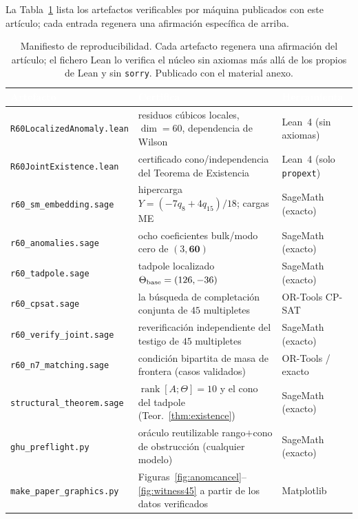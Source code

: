 \documentclass[11pt,a4paper]{article}
\begin{document}
La Tabla~\ref{tab:artifacts} lista los artefactos verificables por m\'aquina publicados con este
art\'iculo; cada entrada regenera una afirmaci\'on espec\'ifica de arriba.

\begin{table}[h]
\centering
\footnotesize
{}
\begin{tabular}{lll}
\toprule
\rowcolor{hdrblue}
\textcolor{white}{Artefacto} & \textcolor{white}{Certifica} & \textcolor{white}{Herramienta}\\
\midrule
\texttt{R60LocalizedAnomaly.lean} & residuos c\'ubicos locales, $\dim=60$, dependencia de Wilson & Lean~4 (sin axiomas)\\
\texttt{R60JointExistence.lean}   & certificado cono/independencia del Teorema de Existencia & Lean~4 (solo \texttt{propext})\\
\texttt{r60\_sm\_embedding.sage}   & hipercarga $Y=(-7q_8+4q_{15})/18$; cargas ME & SageMath (exacto)\\
\texttt{r60\_anomalies.sage}       & ocho coeficientes bulk/modo cero de $(3,\mathbf{60})$ & SageMath (exacto)\\
\texttt{r60\_tadpole.sage}         & tadpole localizado $\Theta_{\rm base}=(126,-36)$ & SageMath (exacto)\\
\texttt{r60\_cpsat.sage}           & la b\'usqueda de completaci\'on conjunta de $45$ multipletes & OR-Tools CP-SAT\\
\texttt{r60\_verify\_joint.sage}   & reverificaci\'on independiente del testigo de $45$ multipletes & SageMath (exacto)\\
\texttt{r60\_n7\_matching.sage}    & condici\'on bipartita de masa de frontera (casos validados) & OR-Tools / exacto\\
\texttt{structural\_theorem.sage} & $\operatorname{rank}[A;\Theta]=10$ y el cono del tadpole (Teor.~\ref{thm:existence}) & SageMath (exacto)\\
\texttt{ghu\_preflight.py}        & or\'aculo reutilizable rango$+$cono de obstrucci\'on (cualquier modelo) & SageMath (exacto)\\
\texttt{make\_paper\_graphics.py}  & Figuras~\ref{fig:anomcancel}--\ref{fig:witness45} a partir de los datos verificados & Matplotlib\\
\bottomrule
\end{tabular}
\caption{Manifiesto de reproducibilidad. Cada artefacto regenera una afirmaci\'on del
art\'iculo; el fichero Lean lo verifica el n\'ucleo sin axiomas m\'as all\'a de los propios de
Lean y sin \texttt{sorry}. Publicado con el material anexo.}
\label{tab:artifacts}
\end{table}
\end{document}

